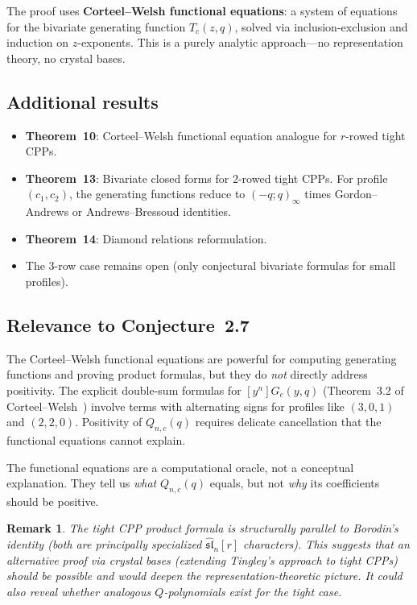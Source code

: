 \documentclass[11pt]{article}
\newtheorem{remark}[theorem]{Remark}
\newcommand{\sln}{\widehat{\mathfrak{sl}}_n}
\begin{document}
The proof uses \textbf{Corteel--Welsh functional equations}:
a system of equations for the bivariate generating function
$T_c(z, q)$, solved via inclusion-exclusion and induction on
$z$-exponents. This is a purely analytic approach---no
representation theory, no crystal bases.

\subsection{Additional results}

\begin{itemize}
  \item \textbf{Theorem~10}: Corteel--Welsh functional equation
    analogue for $r$-rowed tight CPPs.
  \item \textbf{Theorem~13}: Bivariate closed forms for
    2-rowed tight CPPs. For profile $(c_1, c_2)$, the generating
    functions reduce to $(-q;q)_\infty$ times Gordon--Andrews or
    Andrews--Bressoud identities.
  \item \textbf{Theorem~14}: Diamond relations reformulation.
  \item The 3-row case remains open (only conjectural bivariate
    formulas for small profiles).
\end{itemize}

\subsection{Relevance to Conjecture~2.7}

The Corteel--Welsh functional equations are powerful for
computing generating functions and proving product formulas,
but they do \emph{not} directly address positivity. The explicit
double-sum formulas for $[y^n] G_c(y,q)$ (Theorem~3.2 of
Corteel--Welsh~\cite{corteel-welsh-2019}) involve terms with
alternating signs for profiles like $(3,0,1)$ and $(2,2,0)$.
Positivity of $Q_{n,c}(q)$ requires delicate cancellation that
the functional equations cannot explain.

The functional equations are a computational oracle, not a
conceptual explanation. They tell us \emph{what} $Q_{n,c}(q)$
equals, but not \emph{why} its coefficients should be positive.

\begin{remark}
The tight CPP product formula is structurally parallel to
Borodin's identity (both are principally specialized
$\sln[r]$ characters). This suggests that an alternative proof
via crystal bases (extending Tingley's approach to tight CPPs)
should be possible and would deepen the representation-theoretic
picture. It could also reveal whether analogous $Q$-polynomials
exist for the tight case.
\end{remark}
\end{document}
